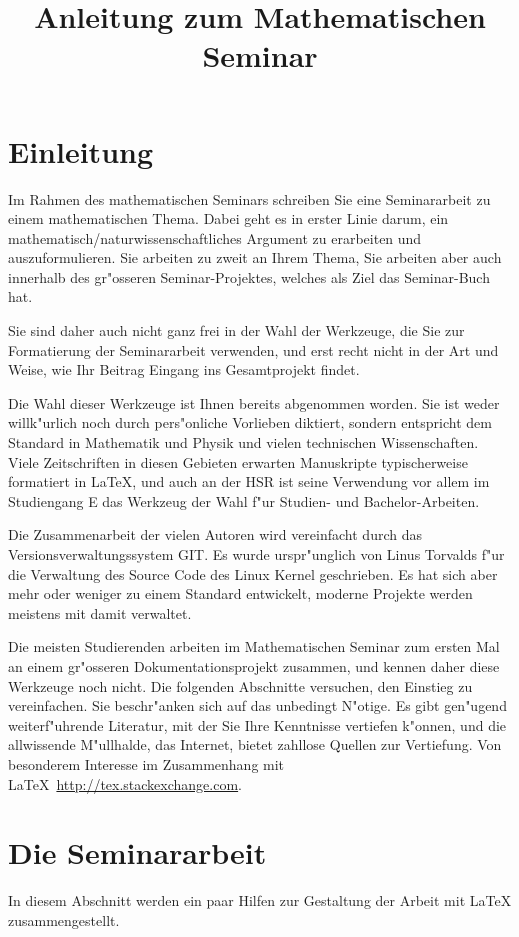\documentclass[a4paper,12pt]{article}
\begin{document}
\title{Anleitung zum Mathematischen Seminar}
\date{}
\maketitle
\section{Einleitung\label{einleitung}}
Im Rahmen des mathematischen Seminars schreiben Sie eine Seminararbeit
zu einem mathematischen Thema.
Dabei geht es in erster Linie darum, ein mathematisch/naturwissenschaftliches
Argument zu erarbeiten und auszuformulieren.
Sie arbeiten zu zweit an Ihrem Thema, Sie arbeiten aber auch 
innerhalb des gr"osseren Seminar-Projektes, welches als Ziel das
Seminar-Buch hat.

Sie sind daher auch nicht ganz frei in der Wahl der Werkzeuge, die Sie
zur Formatierung der Seminararbeit verwenden, und erst recht nicht
in der Art und Weise, wie Ihr Beitrag Eingang ins Gesamtprojekt findet.

Die Wahl dieser Werkzeuge ist Ihnen bereits abgenommen worden.
Sie ist weder willk"urlich noch durch pers"onliche Vorlieben diktiert,
sondern entspricht dem Standard in Mathematik und Physik und vielen
technischen Wissenschaften.
Viele Zeitschriften in diesen Gebieten erwarten Manuskripte typischerweise
formatiert in \LaTeX, und auch an der HSR ist seine Verwendung 
vor allem im Studiengang E das Werkzeug der Wahl f"ur Studien- und
Bachelor-Arbeiten.

Die Zusammenarbeit der vielen Autoren wird vereinfacht durch das
Versionsverwaltungssystem GIT.
Es wurde urspr"unglich von Linus Torvalds f"ur die Verwaltung des
Source Code des Linux Kernel geschrieben.
Es hat sich aber mehr oder weniger zu einem Standard entwickelt,
moderne Projekte werden meistens mit damit verwaltet.

Die meisten Studierenden arbeiten im Mathematischen Seminar zum ersten
Mal an einem gr"osseren Dokumentationsprojekt zusammen, und kennen daher
diese Werkzeuge noch nicht.
Die folgenden Abschnitte versuchen, den Einstieg zu vereinfachen.
Sie beschr"anken sich auf das unbedingt N"otige.
Es gibt gen"ugend weiterf"uhrende Literatur, mit der Sie Ihre Kenntnisse
vertiefen k"onnen, und die allwissende M"ullhalde, das Internet,
bietet zahllose Quellen zur Vertiefung.
Von besonderem Interesse im Zusammenhang mit
\LaTeX\ \url{http://tex.stackexchange.com}.

\section{Die Seminararbeit\label{seminararbeit}}
In diesem Abschnitt werden ein paar Hilfen zur Gestaltung der Arbeit
mit \LaTeX{} zusammengestellt.
\end{document}

